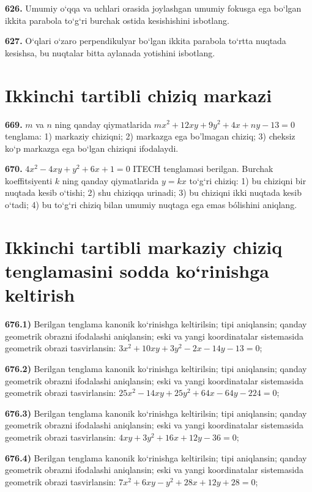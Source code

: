 \textbf{626.} Umumiy o‘qqa va uchlari orasida joylashgan umumiy fokusga ega bo‘lgan ikkita parabola to‘g‘ri burchak ostida kesishishini isbotlang.

\textbf{627.} O‘qlari o‘zaro perpendikulyar bo‘lgan ikkita parabola to‘rtta nuqtada kesishsa, bu nuqtalar bitta aylanada yotishini isbotlang.



\section{ Ikkinchi tartibli chiziq markazi }



\textbf{669.} $m$ va $n$ ning qanday qiymatlarida $m x^2+12 x y+9 y^2+4 x+n y-13=0$ tenglama: 1) markaziy chiziqni; 2) markazga ega bo'lmagan chiziq; 3) cheksiz ko‘p markazga ega bo‘lgan chiziqni ifodalaydi.

\textbf{670.} $4 x^2-4 x y+y^2+6 x+1=0$ ITECH tenglamasi berilgan. Burchak koeffitsiyenti $k$ ning qanday qiymatlarida $y=kx$ to‘g‘ri chiziq: 1) bu chiziqni bir nuqtada kesib o‘tishi; 2) shu chiziqqa urinadi; 3) bu chiziqni ikki nuqtada kesib o‘tadi; 4) bu to‘g‘ri chiziq bilan umumiy nuqtaga ega emas bólishini aniqlang.



\section{Ikkinchi tartibli markaziy chiziq tenglamasini sodda ko‘rinishga keltirish}



\textbf{676.1)} Berilgan tenglama kanonik ko‘rinishga keltirilsin; tipi aniqlansin; qanday geometrik obrazni ifodalashi aniqlansin; eski va yangi koordinatalar sistemasida geometrik obrazi tasvirlansin: $3 x^2+10 x y+3 y^2-2 x-14 y-13=0$;

\textbf{676.2)} Berilgan tenglama kanonik ko‘rinishga keltirilsin; tipi aniqlansin; qanday geometrik obrazni ifodalashi aniqlansin; eski va yangi koordinatalar sistemasida geometrik obrazi tasvirlansin: $25 x^2-14 x y+25 y^2+64 x-64 y-224=0$;

\textbf{676.3)} Berilgan tenglama kanonik ko‘rinishga keltirilsin; tipi aniqlansin; qanday geometrik obrazni ifodalashi aniqlansin; eski va yangi koordinatalar sistemasida geometrik obrazi tasvirlansin: $4 x y+3 y^2+16 x+12 y-36=0$;

\textbf{676.4)} Berilgan tenglama kanonik ko‘rinishga keltirilsin; tipi aniqlansin; qanday geometrik obrazni ifodalashi aniqlansin; eski va yangi koordinatalar sistemasida geometrik obrazi tasvirlansin: $7 x^2+6 x y-y^2+28 x+12 y+28=0$;

